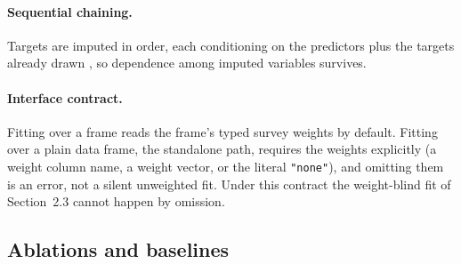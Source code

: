 \paragraph{Sequential chaining.} Targets are imputed in order, each
conditioning on the predictors plus the targets already drawn
\citep{raghunathan2001multivariate, vanbuuren2011mice}, so dependence among
imputed variables survives.

\paragraph{Interface contract.} Fitting over a \populace{} frame reads the
frame's typed survey weights by default. Fitting over a plain data frame,
the standalone path, requires the weights explicitly (a weight column name,
a weight vector, or the literal \texttt{"none"}), and omitting them is an
error, not a silent unweighted fit. Under this contract the weight-blind fit
of Section~2.3 cannot happen by omission.

\subsection{Ablations and baselines}
\label{sec:ablations}

